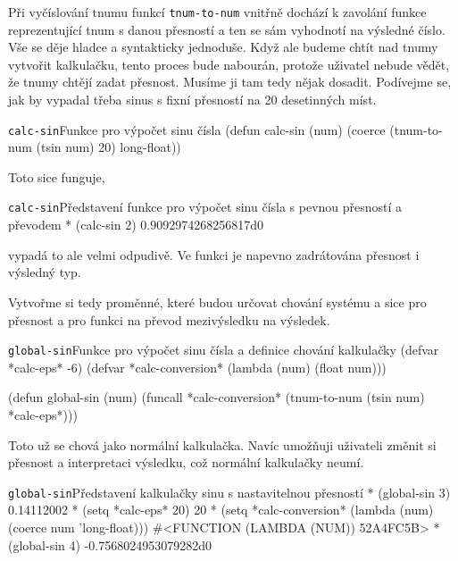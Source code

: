 Při vyčíslování tnumu funkcí \texttt{tnum-to-num} vnitřně dochází k zavolání funkce reprezentující tnum s danou přesností a ten se sám vyhodnotí na výsledné číslo. Vše se děje hladce a syntakticky jednoduše. Když ale budeme chtít nad tnumy vytvořit kalkulačku, tento proces bude nabourán, protože uživatel nebude vědět, že tnumy chtějí zadat přesnost. Musíme ji tam tedy nějak dosadit. Podívejme se, jak by vypadal třeba sinus s fixní přesností na 20 desetinných míst.

\begin{lispcode}{\texttt{calc-sin}}{Funkce pro výpočet sinu čísla}
(\textcolor{funkcionalni}{defun} \textcolor{pojmenovan}{calc-sin} (num)
  (\textcolor{matematicke}{coerce} (\textcolor{moje}{tnum-to-num} (\textcolor{moje}{tsin} num) 20) \textquotesingle\textcolor{moje}{long-float}))
\end{lispcode}

Toto sice funguje,

\begin{lisptest}{\texttt{calc-sin}}{Představení funkce pro výpočet sinu čísla s pevnou přesností a převodem}{}
* (calc-sin 2)
0.9092974268256817d0
\end{lisptest}

vypadá to ale velmi odpudivě. Ve funkci je napevno zadrátována přesnost i výsledný typ.

Vytvořme si tedy proměnné, které budou určovat chování systému a sice pro přesnost a pro funkci na převod mezivýsledku na výsledek.

\begin{lispcode}{\texttt{global-sin}}{Funkce pro výpočet sinu čísla a definice chování kalkulačky}
(\textcolor{funkcionalni}{defvar} \textcolor{obarvi}{*calc-eps*} -6)
(\textcolor{funkcionalni}{defvar} \textcolor{obarvi}{*calc-conversion*} (\textcolor{funkcionalni}{lambda} (num) (\textcolor{matematicke}{float} num)))

(\textcolor{funkcionalni}{defun} \textcolor{pojmenovan}{global-sin} (num)
  (\textcolor{funkcionalni}{funcall} \textcolor{obarvi}{*calc-conversion*} 
    (\textcolor{moje}{tnum-to-num} (\textcolor{moje}{tsin} num) \textcolor{obarvi}{*calc-eps*})))
\end{lispcode}

Toto už se chová jako normální kalkulačka. Navíc umožňuji uživateli změnit si přesnost a interpretaci výsledku, což normální kalkulačky neumí.

\begin{lisptest}{\texttt{global-sin}}{Představení kalkulačky sinu s nastavitelnou přesností}
* (global-sin 3)
0.14112002
* (setq *calc-eps* 20)
20
* (setq *calc-conversion*
	(lambda (num) (coerce num 'long-float)))
#<FUNCTION (LAMBDA (NUM)) {52A4FC5B}>
* (global-sin 4)
-0.7568024953079282d0
\end{lisptest}

